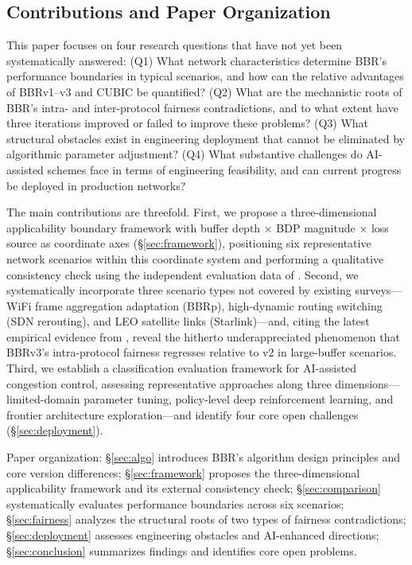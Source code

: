 \documentclass[a4paper,fleqn]{cas-sc}
\begin{document}
\subsection{Contributions and Paper Organization}
\label{sec:contrib}

This paper focuses on four research questions that have not yet been
systematically answered: (Q1) What network characteristics determine BBR's
performance boundaries in typical scenarios, and how can the relative
advantages of BBRv1--v3 and CUBIC be quantified? (Q2) What are the mechanistic
roots of BBR's intra- and inter-protocol fairness contradictions, and to what
extent have three iterations improved or failed to improve these problems?
(Q3) What structural obstacles exist in engineering deployment that cannot be
eliminated by algorithmic parameter adjustment? (Q4) What substantive challenges
do AI-assisted schemes face in terms of engineering feasibility, and can current
progress be deployed in production networks?

The main contributions are threefold. First, we propose a three-dimensional
applicability boundary framework with buffer depth $\times$ BDP magnitude
$\times$ loss source as coordinate axes (\S\ref{sec:framework}), positioning
six representative network scenarios within this coordinate system and performing
a qualitative consistency check using the independent evaluation data of
\citet{scholz2018deeper}. Second, we systematically incorporate three scenario
types not covered by existing surveys---WiFi frame aggregation adaptation (BBRp),
high-dynamic routing switching (SDN rerouting), and LEO satellite links
(Starlink)---and, citing the latest empirical evidence from
\citet{piotrowska2024}, reveal the hitherto underappreciated phenomenon that
BBRv3's intra-protocol fairness regresses relative to v2 in large-buffer
scenarios. Third, we establish a classification evaluation framework for
AI-assisted congestion control, assessing representative approaches along three
dimensions---limited-domain parameter tuning, policy-level deep reinforcement
learning, and frontier architecture exploration---and identify four core open
challenges (\S\ref{sec:deployment}).

Paper organization: \S\ref{sec:algo} introduces BBR's algorithm design
principles and core version differences; \S\ref{sec:framework} proposes the
three-dimensional applicability framework and its external consistency check;
\S\ref{sec:comparison} systematically evaluates performance boundaries across
six scenarios; \S\ref{sec:fairness} analyzes the structural roots of two types
of fairness contradictions; \S\ref{sec:deployment} assesses engineering obstacles
and AI-enhanced directions; \S\ref{sec:conclusion} summarizes findings and
identifies core open problems.
\end{document}
